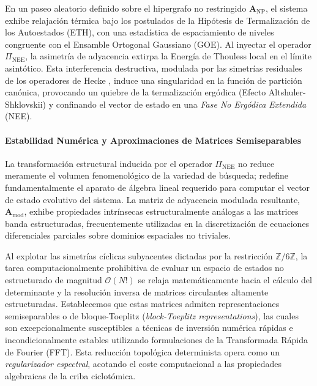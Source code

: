 \documentclass[sn-mathphys]{sn-jnl}
\newcommand{\Zmod}{\mathbb{Z}/6\mathbb{Z}}
\begin{document}
\begin{lemma}
En un paseo aleatorio definido sobre el hipergrafo no restringido $\mathbf{A}_{\text{NP}}$, el sistema exhibe relajación térmica bajo los postulados de la Hipótesis de Termalización de los Autoestados (ETH), con una estadística de espaciamiento de niveles congruente con el Ensamble Ortogonal Gaussiano (GOE). Al inyectar el operador $\Pi_{\text{NEE}}$, la asimetría de adyacencia extirpa la Energía de Thouless local en el límite asintótico. Esta interferencia destructiva, modulada por las simetrías residuales de los operadores de Hecke \cite{Sarnak1995}, induce una singularidad en la función de partición canónica, provocando un quiebre de la termalización ergódica (Efecto Altshuler-Shklovskii) y confinando el vector de estado en una \textit{Fase No Ergódica Extendida} (NEE).
\end{lemma}

\paragraph{Estabilidad Numérica y Aproximaciones de Matrices Semiseparables}
La transformación estructural inducida por el operador $\Pi_{\text{NEE}}$ no reduce meramente el volumen fenomenológico de la variedad de búsqueda; redefine fundamentalmente el aparato de álgebra lineal requerido para computar el vector de estado evolutivo del sistema. La matriz de adyacencia modulada resultante, $\mathbf{A}_{\text{mod}}$, exhibe propiedades intrínsecas estructuralmente análogas a las matrices banda estructuradas, frecuentemente utilizadas en la discretización de ecuaciones diferenciales parciales sobre dominios espaciales no triviales. 

Al explotar las simetrías cíclicas subyacentes dictadas por la restricción $\Zmod$, la tarea computacionalmente prohibitiva de evaluar un espacio de estados no estructurado de magnitud $\mathcal{O}(N!)$ se relaja matemáticamente hacia el cálculo del determinante y la resolución inversa de matrices circulantes altamente estructuradas. Establecemos que estas matrices admiten representaciones semiseparables o de bloque-Toeplitz (\textit{block-Toeplitz representations}), las cuales son excepcionalmente susceptibles a técnicas de inversión numérica rápidas e incondicionalmente estables utilizando formulaciones de la Transformada Rápida de Fourier (FFT). Esta reducción topológica determinista opera como un \textit{regularizador espectral}, acotando el coste computacional a las propiedades algebraicas de la criba ciclotómica.
\end{document}
